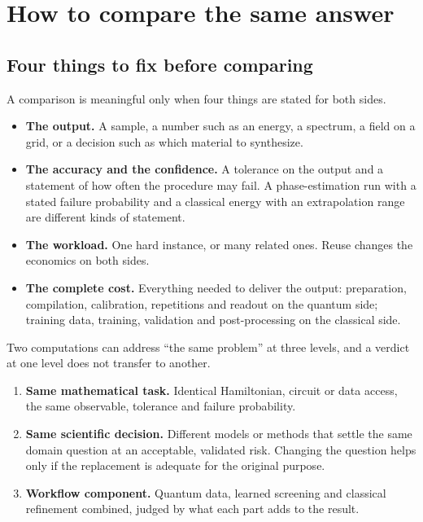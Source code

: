 \section{How to compare the same answer}
\label{sec:compare}

\subsection{Four things to fix before comparing}
A comparison is meaningful only when four things are stated for both sides.
\begin{itemize}
\item \textbf{The output.} A sample, a number such as an energy, a spectrum, a field on a grid, or a decision such as which material to synthesize.
\item \textbf{The accuracy and the confidence.} A tolerance on the output and a statement of how often the procedure may fail. A phase-estimation run with a stated failure probability and a classical energy with an extrapolation range are different kinds of statement.
\item \textbf{The workload.} One hard instance, or many related ones. Reuse changes the economics on both sides.
\item \textbf{The complete cost.} Everything needed to deliver the output: preparation, compilation, calibration, repetitions and readout on the quantum side; training data, training, validation and post-processing on the classical side.
\end{itemize}

Two computations can address ``the same problem'' at three levels, and a verdict at one level does not transfer to another.
\begin{enumerate}
\item \textbf{Same mathematical task.} Identical Hamiltonian, circuit or data access, the same observable, tolerance and failure probability.
\item \textbf{Same scientific decision.} Different models or methods that settle the same domain question at an acceptable, validated risk. Changing the question helps only if the replacement is adequate for the original purpose.
\item \textbf{Workflow component.} Quantum data, learned screening and classical refinement combined, judged by what each part adds to the result.
\end{enumerate}

